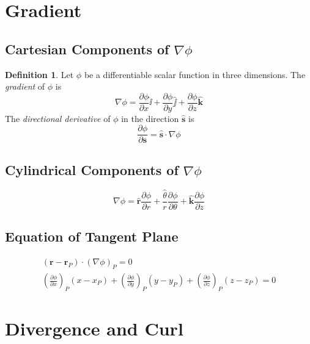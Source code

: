 \documentclass{article}
\theoremstyle{definition}
\theoremstyle{definition}
\newtheorem*{defn}{Definition}
\theoremstyle{remark}
\newcommand{\bhat}[1]{\mathbf{\hat{#1}}}
\newcommand{\ihat}{\bhat{\ii}}
\newcommand{\jhat}{\bhat{\jj}}
\newcommand{\khat}{\bhat{k}}
\begin{document}
\section{Gradient}

\subsection{Cartesian Components of $\nabla \phi$}

\begin{defn}
Let $\phi$ be a differentiable scalar function in three dimensions. The \emph{gradient} of $\phi$ is
\begin{equation*}
    \nabla \phi = \frac{\partial \phi}{\partial x} \ihat + \frac{\partial \phi}{\partial y} \jhat + \frac{\partial \phi}{\partial z} \khat
\end{equation*}
The \emph{directional derivative} of $\phi$ in the direction $\bhat{s}$ is
\begin{equation*}
    \frac{\partial\phi}{\partial \mathbf{s}} = \bhat{s} \cdot \nabla \phi
\end{equation*}
\end{defn}

\subsection{Cylindrical Components of $\nabla \phi$}

\begin{equation*}
    \nabla \phi = \bhat{r} \frac{\partial \phi}{\partial r} + \frac{\hat{\theta}}{r} \frac{\partial \phi}{\partial \theta} + \khat \frac{\partial \phi}{\partial z}
\end{equation*}

\subsection{Equation of Tangent Plane}

\begin{gather*}
    (\mathbf{r} - \mathbf{r}_P) \cdot (\nabla \phi)_P = 0 \\
    \left(\frac{\partial \phi}{\partial x}\right)_P (x - x_P) + \left(\frac{\partial \phi}{\partial y}\right)_P (y - y_P) + \left(\frac{\partial \phi}{\partial z}\right)_P (z - z_P) = 0
\end{gather*}

\section{Divergence and Curl}
\end{document}
